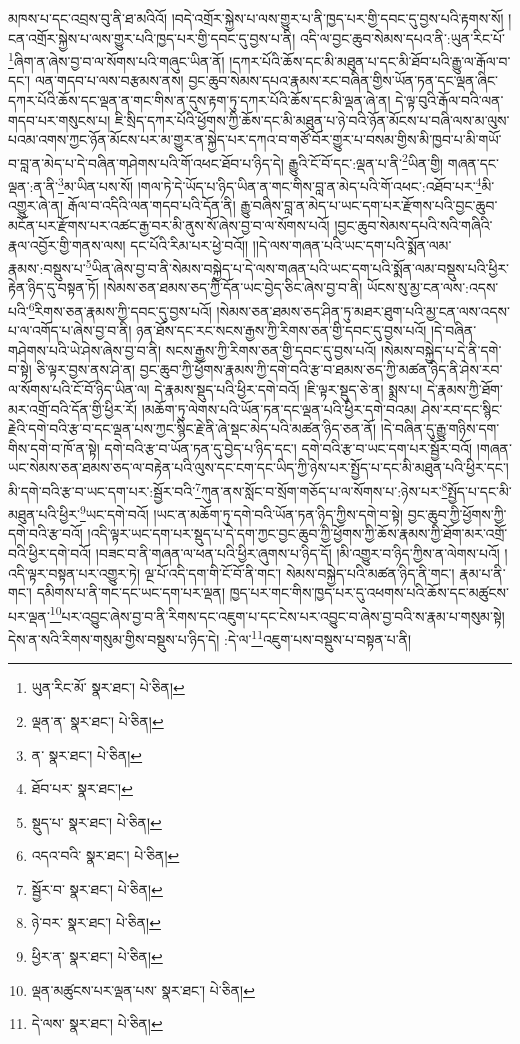 མཁས་པ་དང་འབྲས་བུ་ནི་ཐ་མའིའོ། །བདེ་འགྲོར་སྐྱེས་པ་ལས་གྱུར་པ་ནི་ཁྱད་པར་གྱི་དབང་དུ་བྱས་པའི་རྟགས་སོ། །ངན་འགྲོར་སྐྱེས་པ་ལས་གྱུར་པའི་ཁྱད་པར་གྱི་དབང་དུ་བྱས་པ་ནི། འདི་ལ་བྱང་ཆུབ་སེམས་དཔའ་ནི་:ཡུན་རིང་པོ་\footnote{ཡུན་རིང་མོ་  སྣར་ཐང་།  པེ་ཅིན། }ཞིག་ན་ཞེས་བྱ་བ་ལ་སོགས་པའི་གཞུང་ཡིན་ནོ། །དཀར་པོའི་ཆོས་དང་མི་མཐུན་པ་དང་མི་ཐོབ་པའི་རྒྱུ་ལ་རྒོལ་བ་དང་། ལན་གདབ་པ་ལས་བརྩམས་ནས། བྱང་ཆུབ་སེམས་དཔའ་རྣམས་རང་བཞིན་གྱིས་ཡོན་ཏན་དང་ལྡན་ཞིང་དཀར་པོའི་ཆོས་དང་ལྡན་ན་གང་གིས་ན་དུས་རྟག་ཏུ་དཀར་པོའི་ཆོས་དང་མི་ལྡན་ཞེ་ན། དེ་ལྟ་བུའི་རྒོལ་བའི་ལན་གདབ་པར་གསུངས་པ། ཇི་སྲིད་དཀར་པོའི་ཕྱོགས་ཀྱི་ཆོས་དང་མི་མཐུན་པ་ཉེ་བའི་ཉོན་མོངས་པ་བཞི་ལས་མ་ལུས་པའམ་འགས་ཀྱང་ཉོན་མོངས་པར་མ་གྱུར་ན་སྐྱེད་པར་དཀའ་བ་གཙོ་བོར་གྱུར་པ་བསམ་གྱིས་མི་ཁྱབ་པ་མི་གཡོ་བ་བླ་ན་མེད་པ་དེ་བཞིན་གཤེགས་པའི་གོ་འཕང་ཐོབ་པ་ཉིད་དེ། རྒྱུའི་ངོ་བོ་དང་:ལྡན་པ་ནི་\footnote{ལྡན་ན་  སྣར་ཐང་།  པེ་ཅིན། }ཡིན་གྱི། གཞན་དང་ལྡན་:ན་ནི་\footnote{ན་  སྣར་ཐང་།  པེ་ཅིན། }མ་ཡིན་པས་སོ། །གལ་ཏེ་དེ་ཡོད་པ་ཉིད་ཡིན་ན་གང་གིས་བླ་ན་མེད་པའི་གོ་འཕང་:འཐོབ་པར་\footnote{ཐོབ་པར་  སྣར་ཐང་། }མི་འགྱུར་ཞེ་ན། རྒོལ་བ་འདིའི་ལན་གདབ་པའི་དོན་ནི། རྒྱུ་བཞིས་བླ་ན་མེད་པ་ཡང་དག་པར་རྫོགས་པའི་བྱང་ཆུབ་མངོན་པར་རྫོགས་པར་འཚང་རྒྱ་བར་མི་ནུས་སོ་ཞེས་བྱ་བ་ལ་སོགས་པའོ། །བྱང་ཆུབ་སེམས་དཔའི་སའི་གཞིའི་རྣལ་འབྱོར་གྱི་གནས་ལས། དང་པོའི་རིམ་པར་ཕྱེ་བའོ།། །།དེ་ལས་གཞན་པའི་ཡང་དག་པའི་སྨོན་ལམ་རྣམས་:བསྡུས་པ་\footnote{སྡུད་པ་  སྣར་ཐང་།  པེ་ཅིན། }ཡིན་ཞེས་བྱ་བ་ནི་སེམས་བསྐྱེད་པ་དེ་ལས་གཞན་པའི་ཡང་དག་པའི་སྨོན་ལམ་བསྡུས་པའི་ཕྱིར་རྟེན་ཉིད་དུ་བསྟན་ཏོ། །སེམས་ཅན་ཐམས་ཅད་ཀྱི་དོན་ཡང་བྱེད་ཅིང་ཞེས་བྱ་བ་ནི། ཡོངས་སུ་མྱ་ངན་ལས་:འདས་པའི་\footnote{འདའ་བའི་  སྣར་ཐང་།  པེ་ཅིན། }རིགས་ཅན་རྣམས་ཀྱི་དབང་དུ་བྱས་པའོ། །སེམས་ཅན་ཐམས་ཅད་ཤིན་ཏུ་མཐར་ཐུག་པའི་མྱ་ངན་ལས་འདས་པ་ལ་འགོད་པ་ཞེས་བྱ་བ་ནི། ཉན་ཐོས་དང་རང་སངས་རྒྱས་ཀྱི་རིགས་ཅན་གྱི་དབང་དུ་བྱས་པའོ། །དེ་བཞིན་གཤེགས་པའི་ཡེ་ཤེས་ཞེས་བྱ་བ་ནི། སངས་རྒྱས་ཀྱི་རིགས་ཅན་གྱི་དབང་དུ་བྱས་པའོ། །སེམས་བསྐྱེད་པ་དེ་ནི་དགེ་བ་སྟེ། ཅི་ལྟར་བྱས་ནས་ཤེ་ན། བྱང་ཆུབ་ཀྱི་ཕྱོགས་རྣམས་ཀྱི་དགེ་བའི་རྩ་བ་ཐམས་ཅད་ཀྱི་མཚན་ཉིད་ནི་ཤེས་རབ་ལ་སོགས་པའི་ངོ་བོ་ཉིད་ཡིན་ལ། དེ་རྣམས་སྡུད་པའི་ཕྱིར་དགེ་བའོ། །ཇི་ལྟར་སྡུད་ཅེ་ན། སྨྲས་པ། དེ་རྣམས་ཀྱི་ཐོག་མར་འགྲོ་བའི་དོན་གྱི་ཕྱིར་རོ། །མཆོག་ཏུ་ལེགས་པའི་ཡོན་ཏན་དང་ལྡན་པའི་ཕྱིར་དགེ་བའམ། ཤེས་རབ་དང་སྙིང་རྗེའི་དགེ་བའི་རྩ་བ་དང་ལྡན་པས་ཀྱང་སྙིང་རྗེ་ནི་ཞེ་སྡང་མེད་པའི་མཚན་ཉིད་ཅན་ནོ། །དེ་བཞིན་དུ་རྒྱུ་གཉིས་དག་གིས་དགེ་བ་ཁོ་ན་སྟེ། དགེ་བའི་རྩ་བ་ཡོན་ཏན་དུ་བྱེད་པ་ཉིད་དང་། དགེ་བའི་རྩ་བ་ཡང་དག་པར་སྦྱོར་བའོ། །གཞན་ཡང་སེམས་ཅན་ཐམས་ཅད་ལ་བརྟེན་པའི་ལུས་དང་ངག་དང་ཡིད་ཀྱི་ཉེས་པར་སྤྱོད་པ་དང་མི་མཐུན་པའི་ཕྱིར་དང་། མི་དགེ་བའི་རྩ་བ་ཡང་དག་པར་:སྦྱོར་བའི་\footnote{སྦྱོར་བ་  སྣར་ཐང་།  པེ་ཅིན། }ཀུན་ནས་སློང་བ་སྲོག་གཅོད་པ་ལ་སོགས་པ་:ཉེས་པར་\footnote{ཉེ་བར་  སྣར་ཐང་།  པེ་ཅིན། }སྤྱོད་པ་དང་མི་མཐུན་པའི་ཕྱིར་\footnote{ཕྱིར་ན་  སྣར་ཐང་།  པེ་ཅིན། }ཡང་དགེ་བའོ། །ཡང་ན་མཆོག་ཏུ་དགེ་བའི་ཡོན་ཏན་ཉིད་ཀྱིས་དགེ་བ་སྟེ། བྱང་ཆུབ་ཀྱི་ཕྱོགས་ཀྱི་དགེ་བའི་རྩ་བའོ། །འདི་ལྟར་ཡང་དག་པར་སྡུད་པ་དེ་དག་ཀྱང་བྱང་ཆུབ་ཀྱི་ཕྱོགས་ཀྱི་ཆོས་རྣམས་ཀྱི་ཐོག་མར་འགྲོ་བའི་ཕྱིར་དགེ་བའོ། །བཟང་བ་ནི་གཞན་ལ་ཕན་པའི་ཕྱིར་ཞུགས་པ་ཉིད་དོ། །མི་འགྱུར་བ་ཉིད་ཀྱིས་ན་ལེགས་པའོ། །འདི་ལྟར་བསྟན་པར་འགྱུར་ཏེ། ལྔ་པོ་འདི་དག་གི་ངོ་བོ་ནི་གང་། སེམས་བསྐྱེད་པའི་མཚན་ཉིད་ནི་གང་། རྣམ་པ་ནི་གང་། དམིགས་པ་ནི་གང་དང་ཡང་དག་པར་ལྡན། ཁྱད་པར་གང་གིས་ཁྱད་པར་དུ་འཕགས་པའི་ཆོས་དང་མཚུངས་པར་ལྡན་\footnote{ལྡན་མཚུངས་པར་ལྡན་པས་  སྣར་ཐང་།  པེ་ཅིན། }པར་འབྱུང་ཞེས་བྱ་བ་ནི་རིགས་དང་འཇུག་པ་དང་ངེས་པར་འབྱུང་བ་ཞེས་བྱ་བའི་ས་རྣམ་པ་གསུམ་སྟེ། དེས་ན་སའི་རིགས་གསུམ་གྱིས་བསྡུས་པ་ཉིད་དེ། :དེ་ལ་\footnote{དེ་ལས་  སྣར་ཐང་།  པེ་ཅིན། }འཇུག་པས་བསྡུས་པ་བསྟན་པ་ནི། 